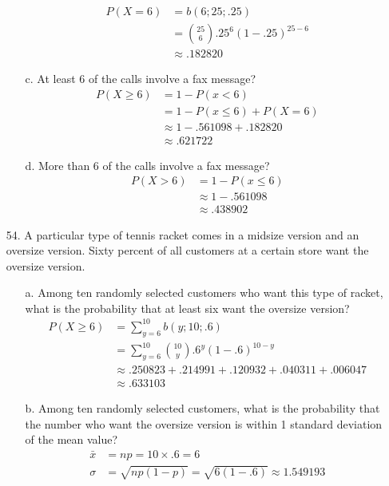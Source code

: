 \documentclass[letterpaper,12pt]{article}
\newcommand{\bp}[3]{%
  \binom{#2}{#1}#3^{#1}(1 - #3)^{#2 - #1}%
}
\begin{document}
\begin{enumerate}
\begin{enumerate}
        \begin{align*}
          P(X = 6) &= b(6; 25; .25) \\
          &= \bp{6}{25}{.25} \\
          &\approx .182820
        \end{align*}
      \item[c.]
        At least 6 of the calls involve a fax message?
        \begin{align*}
          P(X \ge 6) &= 1 - P(x < 6) \\
          &= 1 - P(x \le 6) + P(X = 6) \\
          &\approx 1 - .561098 + .182820 \\
          &\approx .621722
        \end{align*}
      \item[d.]
        More than 6 of the calls involve a fax message?
        \begin{align*}
          P(X > 6) &= 1 - P(x \le 6) \\
          &\approx 1 - .561098 \\
          &\approx  .438902
        \end{align*}
    \end{enumerate}
  \item[54.]
    A particular type of tennis racket comes in a midsize version and an oversize version. Sixty percent of all customers at a certain store want the oversize version.
    \begin{enumerate}
      \item[a.]
        Among ten randomly selected customers who want this type of racket, what is the probability that at least six want the oversize version?
        \begin{align*}
          P(X \ge 6) &= \sum_{y = 6}^{10} b(y; 10; .6) \\
          &= \sum_{y = 6}^{10} \bp{y}{10}{.6} \\
          &\approx .250823 + .214991 + .120932 + .040311 + .006047 \\
          &\approx .633103
        \end{align*}
      \item[b.]
        Among ten randomly selected customers, what is the probability that the number who want the oversize version is within 1 standard deviation of the mean value?
        \begin{align*}
          \bar{x} &= np = 10 \times .6 = 6 \\
          \sigma &= \sqrt{np(1 - p)} = \sqrt{6(1 - .6)} \approx 1.549193

\end{align*}
\end{enumerate}
\end{enumerate}
\end{document}

